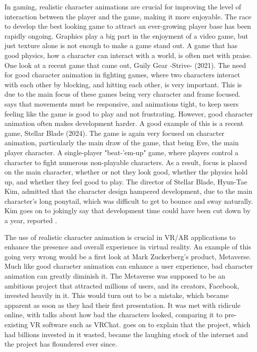 \documentclass{l4proj}
\begin{document}
In gaming, realistic character animations are crucial for improving the level of interaction between the player and the game, making it more enjoyable. The race to develop the best looking game to attract an ever-growing player base has been rapidly ongoing. Graphics play a big part in the enjoyment of a video game, but just texture alone is not enough to make a game stand out. A game that has good physics, how a character can interact with a world, is often met with praise. One look at a recent game that came out, Guily Gear -Strive- (2021). The need for good character animation in fighting games, where two characters interact with each other by blocking, and hitting each other, is very important. This is due to the main focus of these games being very character and frame focused. \cite{guiltygear23} says that movements must be responsive, and animations tight, to keep users feeling like the game is good to play and not frustrating. However, good character animation often makes development harder. A good example of this is a recent game, Stellar Blade (2024). The game is again very focused on character animation, particularly the main draw of the game, that being Eve, the main player character. A single-player "beat-'em-up" game, where players control a character to fight numerous non-playable characters. As a result, focus is placed on the main character, whether or not they look good, whether the physics hold up, and whether they feel good to play. The director of Stellar Blade, Hyun-Tae Kim, admitted that the character design hampered development, due to the main character's long ponytail, which was difficult to get to bounce and sway naturally. Kim goes on to jokingly say that development time could have been cut down by a year, reported \cite{dexerto24}.

The use of realistic character animation is crucial in VR/AR applications to enhance the presence and overall experience in virtual reality. An example of this going very wrong would be a first look at Mark Zuckerberg's product, Metaverse. Much like good character animation can enhance a user experience, bad character animation can greatly diminish it. The Metaverse was supposed to be an ambitious project that attracted millions of users, and its creators, Facebook, invested heavily in it. This would turn out to be a mistake, which became apparent as soon as they had their first presentation. It was met with ridicule online, with talks about how bad the characters looked, comparing it to pre-existing VR software such as VRChat. \cite{wagner23} goes on to explain that the project, which had billions invested in it wasted, became the laughing stock of the internet and the project has floundered ever since. 
\end{document}
